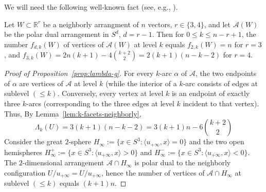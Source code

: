 \documentclass[a4paper,USenglish,cleveref, autoref, thm-restate,nolineno]{socg-lipics-v2021}
\renewcommand{\leq}{\leqslant}
\newcommand{\R}{\mathbb{R}}
\begin{document}
We will need the following well-known fact (see, e.g., \cite[Corollary~8]{Welzl:2001aa}).
\begin{lemma} 
\label{lem:k-facets-neighborly}
Let $W\subset \R^r$ be a neighborly arrangment of $n$ vectors, $r\in \{3,4\}$, and let $\mathcal{A}(W)$ be the polar dual arrangement in $S^d$, $d=r-1$. Then for $0\leq k\leq n-r+1$, the number $f_{d,k}(W)$ of vertices of $\mathcal{A}(W)$ at level $k$ equals $f_{2,k}(W)=n$ for $r=3$, and $f_{3,k}(W)=2n(k+1)-4\binom{k+2}{2}=2(k+1)(n-k-2)$ for $r=4$.
\end{lemma}
%




\begin{proof}[Proof of Proposition~\ref{prop:lambda-g}]
For every $k$-arc $\alpha$ of  $\mathcal{A}$, the two endpoints of $\alpha$ are vertices of $\mathcal{A}$ at level $k$ (while the interior of a $k$-arc consists of edges at sublevel $(\leq k)$. Conversely, every vertex at level $k$ is an endpoint of exactly three $k$-arcs (corresponding to the three edges at level $k$ incident to that vertex). Thus, By Lemma~\ref{lem:k-facets-neighborly},
\begin{equation}
\label{eq:Lambdak}
\Lambda_k(U)=3(k+1)(n-k-2)=3(k+1)n-6\binom{k+2}{2}
\end{equation}
Consider the great $2$-sphere $H_{\infty}:=\{x\in S^3\colon \langle u_{+\infty},x\rangle =0\}$ and the two open hemispheres $H^+_{\infty}:=\{x\in S^3\colon \langle u_{+\infty},x\rangle > 0\}$
and $H^-_{\infty}:=\{x\in S^3\colon \langle u_{+\infty},x\rangle < 0\}$. The $2$-dimensional arrangement $\mathcal{A}\cap H_{\infty}$ is polar dual to the neighborly configuration $U/u_{+\infty}=U/u_{+\infty}$, hence the number of vertices of $\mathcal{A}\cap H_{\infty}$ at sublevel $(\leq k)$ equals $(k+1)n$.


\end{proof}
\end{document}
